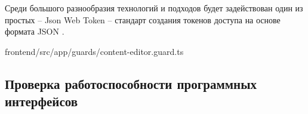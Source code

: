 Среди большого разнообразия технологий и подходов будет задействован один из простых -- Json Web Token \cite{jwt} -- стандарт создания токенов доступа на основе формата JSON \cite{wiki-json}. 



frontend/src/app/guards/content-editor.guard.ts

\subsection{Проверка работоспособности программных интерфейсов}



\clearpage
